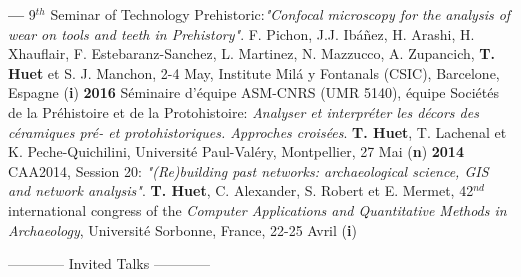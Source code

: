 \documentclass{article}
\newcommand{\fr}[1]{} %
\newcommand{\en}[1]{#1}   %
\begin{document}
{\smallbreak
\textbf{--- }9${}^{th}$ Seminar of Technology Prehistoric:\textit{"Confocal microscopy for the analysis of wear on tools and teeth in Prehistory"}. F. Pichon, J.J. Ibáñez, H. Arashi, H. Xhauflair, F. Estebaranz-Sanchez, L. Martinez, N. Mazzucco, A. Zupancich, \textbf{T. Huet} et S. J. Manchon, 2-4 May, Institute Milá y Fontanals (CSIC), Barcelone, Espagne (\textbf{i})
\smallbreak
\textbf{2016 }S\'{e}minaire d'\'{e}quipe ASM-CNRS (UMR 5140), \'{e}quipe Soci\'{e}t\'{e}s de la Pr\'{e}histoire et de la Protohistoire: \textit{Analyser et interpr\'{e}ter les d\'{e}cors des c\'{e}ramiques pr\'{e}- et protohistoriques. Approches crois\'{e}es}. \textbf{T. Huet}, T. Lachenal et K. Peche-Quichilini, Universit\'{e} Paul-Val\'{e}ry, Montpellier, 27 Mai (\textbf{n})
\smallbreak
\textbf{2014 }CAA2014, Session 20: \textit{"(Re)building past networks: archaeological science, GIS and network analysis"}. \textbf{T. Huet}, C. Alexander, S. Robert et E. Mermet, 42${}^{nd}$ international congress of the \textit{Computer Applications and Quantitative Methods in Archaeology}, Universit\'{e} Sorbonne, France, 22-25 Avril (\textbf{i})
\bigbreak

\begin{center}
\fr{------------ Communications (invitées) ------------}
\en{------------ Invited Talks ------------}
\end{center}
\smallbreak
	

}
\end{document}

